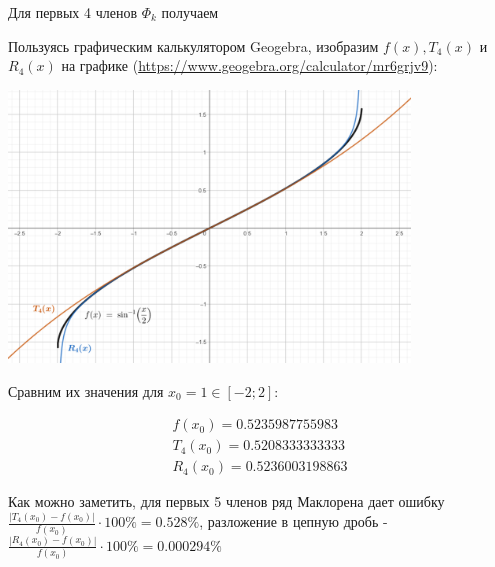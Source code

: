Для первых 4 членов $\Phi_k$ получаем 

Пользуясь графическим калькулятором Geogebra, изобразим $f(x), T_4(x)$ и $R_4(x)$ на графике (\url{https://www.geogebra.org/calculator/mr6grjv9}):

\begin{center}
    \includegraphics[width=0.8\textwidth]{images/4-01}
\end{center}

Сравним их значения для $x_0 = 1 \in [-2;2]$:

\begin{gather*}
    f(x_0) = 0.5235987755983 \\
    T_4(x_0) = 0.5208333333333 \\
    R_4(x_0) = 0.5236003198863
\end{gather*}

Как можно заметить, для первых 5 членов ряд Маклорена дает ошибку $\frac{|T_4(x_0) - f(x_0)|}{f(x_0)} \cdot 100\% = 0.528\%$, 
разложение в цепную дробь - $\frac{|R_4(x_0) - f(x_0)|}{f(x_0)} \cdot 100\% = 0.000294\%$

\clearpage
